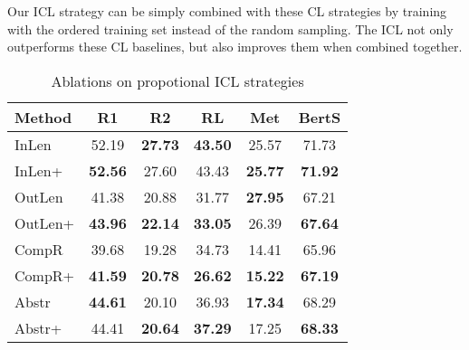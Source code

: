 Our ICL strategy can be simply combined with these CL strategies by training with the ordered training set instead of the random sampling. The ICL not only outperforms these CL baselines, but also improves them when combined together. 

\label{sec:tracl}
\begin{table}[t]
	\scriptsize
	\centering
	\begin{tabular}{lccccc}
		\hline
		{Method} & {R1} & {R2} & {RL} & {Met} & {BertS} \\
		\hline
		InLen & 52.19 & \textbf{27.73} & \textbf{43.50} & 25.57 & 71.73\\
		InLen+ & \textbf{52.56} & 27.60 & 43.43 & \textbf{25.77} & \textbf{71.92}\\
		\hline
		OutLen & 41.38 & 20.88 & 31.77 & \textbf{27.95} & 67.21\\
		OutLen+ &\textbf{43.96} & \textbf{22.14} & \textbf{33.05} & 26.39 & \textbf{67.64} \\
		\hline
		CompR & 39.68 & 19.28 & 34.73 & 14.41 & 65.96 \\
		CompR+ & \textbf{41.59} & \textbf{20.78} & \textbf{26.62} & \textbf{15.22} & \textbf{67.19}\\
		\hline
		Abstr & \textbf{44.61} & 20.10 & 36.93 & \textbf{17.34} & 68.29 \\
		Abstr+ & 44.41 & \textbf{20.64} & \textbf{37.29} & 17.25 & \textbf{68.33} \\
		\hline
	\end{tabular}
	\caption{Ablations on propotional ICL strategies}
	\label{tab:traditional}
\end{table}



